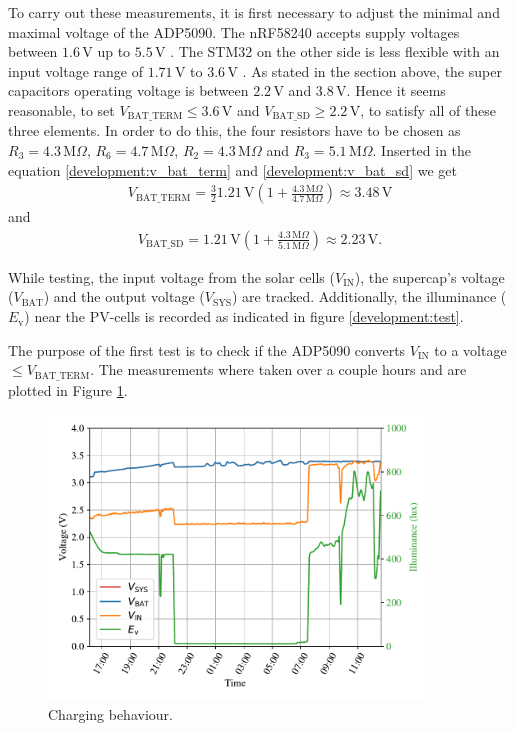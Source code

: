 To carry out these measurements, it is first necessary to adjust the minimal and maximal voltage of the ADP5090.
The nRF58240 accepts supply voltages between $1.6\,\text{V}$ up to $5.5\,\text{V}$ \cite{nrf}.
The STM32 on the other side is less flexible with an input voltage range of $1.71\,\text{V}$ to $3.6\,\text{V}$ \cite{stm32}.
As stated in the section above, the super capacitors operating voltage is between $2.2\,\text{V}$ and $3.8\,\text{V}$.
Hence it seems reasonable, to set $V_{\text{BAT\_TERM}} \le 3.6\,\text{V}$ and $V_{\text{BAT\_SD}} \ge 2.2\,\text{V}$, to satisfy all of these three elements.
In order to do this, the four resistors have to be chosen as $R_3 = 4.3\,\text{M}\Omega$, $R_6 = 4.7\,\text{M}\Omega$, $R_2 = 4.3\,\text{M}\Omega$ and $R_3 = 5.1\,\text{M}\Omega$.
Inserted in the equation \eqref{development:v_bat_term} and \eqref{development:v_bat_sd} we get
\begin{align}
	V_{\text{BAT\_TERM}}= \frac{3}{2} 1.21\,\text{V} \left(1 + \frac{4.3\,\text{M}\Omega}{4.7 \,\text{M}\Omega} \right) \approx 3.48\,\text{V} 
\end{align}
and
\begin{align}
	V_{\text{BAT\_SD}} = 1.21\,\text{V} \left(1 + \frac{4.3\,\text{M}\Omega}{5.1\,\text{M}\Omega} \right) \approx 2.23\,\text{V}. 
\end{align}

While testing, the input voltage from the solar cells ($V_{\text{IN}}$), the supercap's voltage ($V_{\text{BAT}}$) and the output voltage ($V_{\text{SYS}}$) are tracked. Additionally, the illuminance ($E_\text{v}$) near the PV-cells  is recorded as indicated in figure \ref{development:test}.

The purpose of the first test is to check if the ADP5090 converts $V_{\text{IN}}$ to a voltage $\le V_{\text{BAT\_TERM}}$.
The measurements where taken over a couple hours and are plotted in Figure \ref{development:charge}.

\begin{figure}[ht]
	\centering
	\includegraphics[width=0.9\textwidth]{4-development/hardware/graphics/laden.pdf}
	\caption{Charging behaviour.\label{development:charge}}
\end{figure}

